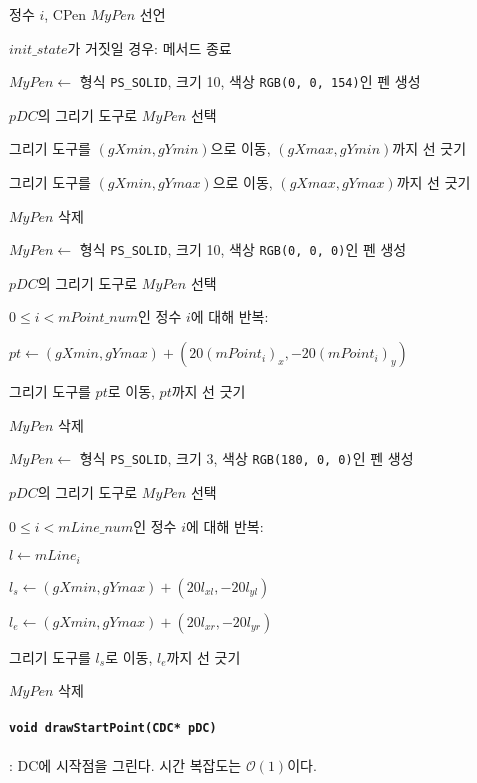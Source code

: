 \begin{algorithm}
	\item 정수 $i$, CPen $MyPen$ 선언
	\item $init\_state$가 거짓일 경우: 메서드 종료
	\item $MyPen \leftarrow $ 형식 \texttt{PS_SOLID}, 크기 10, 색상 \texttt{RGB(0, 0, 154)}인 펜 생성
	\item $pDC$의 그리기 도구로 $MyPen$ 선택
	\item 그리기 도구를 $\left(gXmin, gYmin\right)$으로 이동, $\left(gXmax, gYmin\right)$까지 선 긋기
	\item 그리기 도구를 $\left(gXmin, gYmax\right)$으로 이동, $\left(gXmax, gYmax\right)$까지 선 긋기
	\item $MyPen$ 삭제
	\item $MyPen \leftarrow $ 형식 \texttt{PS_SOLID}, 크기 10, 색상 \texttt{RGB(0, 0, 0)}인 펜 생성
	\item $pDC$의 그리기 도구로 $MyPen$ 선택
	\item $0 \leq i < mPoint\_num$인 정수 $i$에 대해 반복:
	\begin{algorithm}
		\item $pt \leftarrow \left(gXmin, gYmax\right) + \left(20\left(mPoint_i\right)_x, -20\left(mPoint_i\right)_y\right)$
		\item 그리기 도구를 $pt$로 이동, $pt$까지 선 긋기
	\end{algorithm}
	\item $MyPen$ 삭제
	\item $MyPen \leftarrow $ 형식 \texttt{PS_SOLID}, 크기 3, 색상 \texttt{RGB(180, 0, 0)}인 펜 생성
	\item $pDC$의 그리기 도구로 $MyPen$ 선택
	\item $0 \leq i < mLine\_num$인 정수 $i$에 대해 반복:
	\begin{algorithm}
		\item $l \leftarrow mLine_i$
		\item $l_s \leftarrow \left(gXmin, gYmax\right) + \left(20l_{xl}, -20l_{yl}\right)$
		\item $l_e \leftarrow \left(gXmin, gYmax\right) + \left(20l_{xr}, -20l_{yr}\right)$
		\item 그리기 도구를 $l_s$로 이동, $l_e$까지 선 긋기
	\end{algorithm}
	\item $MyPen$ 삭제
\end{algorithm}

\paragraph{\texttt{void drawStartPoint(CDC* pDC)}}: DC에 시작점을 그린다.
시간 복잡도는 $\mathcal{O}\left(1\right)$이다.

